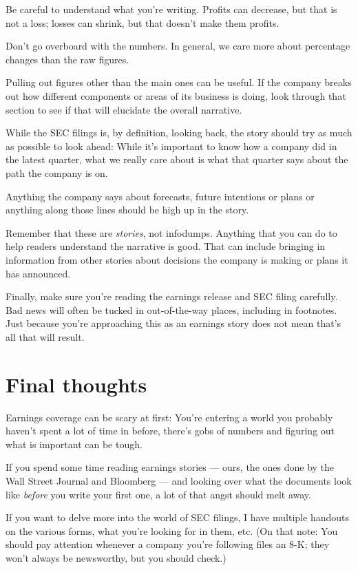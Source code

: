 \documentclass[
  11pt,
  american,
  letterpaperpaper,
  extrafontsizes,onecolumn,openright
  ]{memoir}
\begin{document}
Be careful to understand what you're writing. Profits can decrease, but that is not a loss; losses can shrink, but that doesn't make them profits.

Don't go overboard with the numbers. In general, we care more about percentage changes than the raw figures.

Pulling out figures other than the main ones can be useful. If the company breaks out how different components or areas of its business is doing, look through that section to see if that will elucidate the overall narrative.

While the SEC filings is, by definition, looking back, the story should try as much as possible to look ahead: While it's important to know how a company did in the latest quarter, what we really care about is what that quarter says about the path the company is on.

Anything the company says about forecasts, future intentions or plans or anything along those lines should be high up in the story.

Remember that these are \emph{stories}, not infodumps. Anything that you can do to help readers understand the narrative is good. That can include bringing in information from other stories about decisions the company is making or plans it has announced.

Finally, make sure you're reading the earnings release and SEC filing carefully. Bad news will often be tucked in out-of-the-way places, including in footnotes. Just because you're approaching this as an earnings story does not mean that's all that will result.

\hypertarget{final-thoughts-5}{%
\section*{Final thoughts}\label{final-thoughts-5}}

Earnings coverage can be scary at first: You're entering a world you probably haven't spent a lot of time in before, there's gobs of numbers and figuring out what is important can be tough.

If you spend some time reading earnings stories --- ours, the ones done by the Wall Street Journal and Bloomberg --- and looking over what the documents look like \emph{before} you write your first one, a lot of that angst should melt away.

If you want to delve more into the world of SEC filings, I have multiple handouts on the various forms, what you're looking for in them, etc. (On that note: You should pay attention whenever a company you're following files an 8-K; they won't always be newsworthy, but you should check.)
\end{document}
